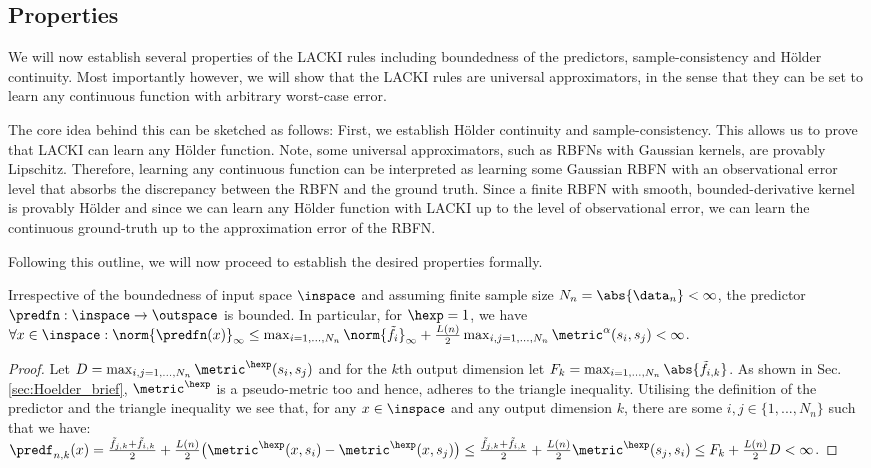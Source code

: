 \subsection{Properties}
\label{sec:properties_lacki}
We will now establish several properties of the LACKI rules including boundedness of the predictors, sample-consistency and H\"older continuity. Most importantly however, we will show that the LACKI rules are universal approximators, in the sense that they can be set to learn any continuous function with arbitrary worst-case error.

The core idea behind this can be sketched as follows: 
First, we establish H\"older continuity and sample-consistency. This allows us to prove that LACKI can learn any H\"older function.
Note, some universal approximators, such as RBFNs with Gaussian kernels, are provably Lipschitz. Therefore, learning any continuous function can be interpreted as learning some Gaussian RBFN with an observational error level that absorbs the discrepancy between the RBFN and the ground truth. Since a finite RBFN with smooth, bounded-derivative kernel is provably H\"older and since we can learn any H\"older function with LACKI up to the level of observational error, we can learn the continuous ground-truth up to the approximation error of the RBFN. 

Following this outline, we will now proceed to establish the desired properties formally.

\begin{lem}
Irrespective of the boundedness of input space $\inspace$ and assuming finite sample size  $N_n=\abs{\data_n} < \infty$, the predictor $\predfn:\inspace \to \outspace$ is bounded. In particular,
for $\hexp =1$, we have  
$\forall x \in \inspace: \norm{\predfn(x)}_\infty \leq \max_{i=1,...,N_n} \norm{\tilde f_i}_\infty + \frac{L(n)}{2}  \max_{i,j = 1,...,N_n} \metric^\alpha(s_i,s_j) <\infty$.
\begin{proof}
Let $D = \max_{i,j = 1,...,N_n} \metric^\hexp(s_i,s_j)$ and for the $k$th output dimension let  $F_k= \max_{i=1,...,N_n} \abs{\tilde f_{i,k}}$. As shown in Sec. \ref{sec:Hoelder_brief}, $\metric^\hexp$ is a pseudo-metric too and hence, adheres to the triangle inequality. Utilising the definition of the predictor and the triangle inequality we see that, for any  $x \in \inspace$ and any output dimension $k$, there are some $i,j \in \{1,...,N_n\}$ such that we have: 
$\predf_{n,k}(x) =\frac{\tilde f_{j,k} + \tilde f_{i,k}}{2} + \frac{L(n)}{2} \bigl( \metric^\hexp(x,s_i) - \metric^\hexp(x,s_j) \bigr) \leq \frac{\tilde f_{j,k} + \tilde f_{i,k}}{2} +  \frac{L(n)}{2} \metric^\hexp(s_j,s_i) \leq F_k + \frac{L(n)}{2}  D < \infty$.
\end{proof}
\label{lem:LACKIpredbounded}
\end{lem}

